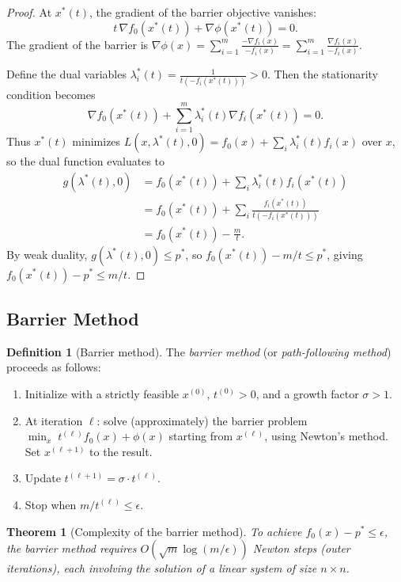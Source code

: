 \documentclass[11pt,a4paper]{article}
\theoremstyle{definition}
\newtheorem{definition}{Definition}[section]
\theoremstyle{plain}
\newtheorem{theorem}{Theorem}[section]
\theoremstyle{remark}
\begin{document}
\begin{proof}
At $x^*(t)$, the gradient of the barrier objective vanishes:
\[
  t\, \nabla f_0(x^*(t)) + \nabla \phi(x^*(t)) = 0.
\]
The gradient of the barrier is
$\nabla \phi(x) = \sum_{i=1}^m \frac{-\nabla f_i(x)}{-f_i(x)}
= \sum_{i=1}^m \frac{\nabla f_i(x)}{-f_i(x)}$.

Define the dual variables $\lambda^*_i(t) = \frac{1}{t(-f_i(x^*(t)))} > 0$.
Then the stationarity condition becomes
\[
  \nabla f_0(x^*(t)) + \sum_{i=1}^m \lambda^*_i(t) \nabla f_i(x^*(t)) = 0.
\]
Thus $x^*(t)$ minimizes $L(x, \lambda^*(t), 0) = f_0(x) + \sum_i \lambda^*_i(t) f_i(x)$ over $x$,
so the dual function evaluates to
\begin{align*}
  g(\lambda^*(t), 0)
  &= f_0(x^*(t)) + \sum_i \lambda^*_i(t) f_i(x^*(t)) \\
  &= f_0(x^*(t)) + \sum_i \frac{f_i(x^*(t))}{t(-f_i(x^*(t)))} \\
  &= f_0(x^*(t)) - \frac{m}{t}.
\end{align*}
By weak duality, $g(\lambda^*(t), 0) \le p^*$, so
$f_0(x^*(t)) - m/t \le p^*$, giving $f_0(x^*(t)) - p^* \le m/t$.
\end{proof}

\subsection{Barrier Method}

\begin{definition}[Barrier method]\label{def:barrier-method}
The \emph{barrier method} (or \emph{path-following method}) proceeds as follows:
\begin{enumerate}
  \item Initialize with a strictly feasible $x^{(0)}$, $t^{(0)} > 0$,
    and a growth factor $\sigma > 1$.
  \item At iteration $\ell$: solve (approximately) the barrier problem
    $\min_x \; t^{(\ell)} f_0(x) + \phi(x)$ starting from $x^{(\ell)}$,
    using Newton's method. Set $x^{(\ell+1)}$ to the result.
  \item Update $t^{(\ell+1)} = \sigma \cdot t^{(\ell)}$.
  \item Stop when $m/t^{(\ell)} \le \epsilon$.
\end{enumerate}
\end{definition}

\begin{theorem}[Complexity of the barrier method]\label{thm:barrier-complexity}
To achieve $f_0(x) - p^* \le \epsilon$, the barrier method requires
$O(\sqrt{m}\log(m/\epsilon))$ Newton steps (outer iterations), each involving
the solution of a linear system of size $n \times n$.
\end{theorem}
\end{document}
